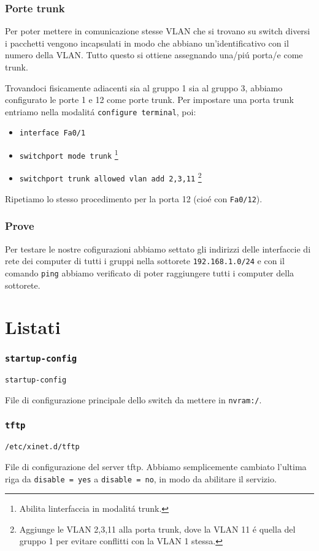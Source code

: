 \documentclass[9pt, a4paper, oneside]{article}
\begin{document}
		\section{Porte trunk}
			\par
				Per poter mettere in comunicazione stesse VLAN 
				che si trovano su switch diversi i pacchetti 
				vengono incapsulati in modo che abbiano 
				un'identificativo con il numero della VLAN. 
				Tutto questo si ottiene assegnando una/pi\'u 
				porta/e come trunk. 
			\par
				Trovandoci fisicamente adiacenti sia al gruppo 
				1 sia al gruppo 3, abbiamo configurato le porte 
				1 e 12 come porte trunk. Per impostare una 
				porta trunk entriamo nella modalit\'a 
				\texttt{configure terminal}, poi:
				\begin{itemize}
					\item
						\texttt{interface Fa0/1}
					\item
						\texttt{switchport mode trunk}
						\footnote{Abilita linterfaccia 
						in modalit\'a trunk.}
					\item
						\texttt{switchport trunk 
						allowed vlan add 2,3,11}
						\footnote{Aggiunge le 
						VLAN 2,3,11 alla porta trunk, 
						dove la VLAN 11 \'e quella del 
						gruppo 1 per evitare conflitti 
						con la VLAN 1 stessa.}
				\end{itemize}
				Ripetiamo lo stesso procedimento per la porta 
				12 (cio\'e con \texttt{Fa0/12}).
		\section{Prove}
			\par
				Per testare le nostre cofigurazioni abbiamo 
				settato gli indirizzi delle interfaccie di rete 
				dei computer di tutti i gruppi nella sottorete 
				\texttt{192.168.1.0/24} e con il comando 
				\texttt{ping} abbiamo verificato di poter 
				raggiungere tutti i computer della sottorete.
		\newpage	
	\part{Listati}					
		 \section{\texttt{startup-config}}
			\par
				\texttt{startup-config}
			\par
				File di configurazione principale dello switch 
				da mettere in \texttt{nvram:/}.
			\texttt{}
			\newpage
		 \section{\texttt{tftp}}
			\par
				\texttt{/etc/xinet.d/tftp}
			\par
				File di configurazione del server tftp. Abbiamo 
				semplicemente cambiato l'ultima riga da 
				\texttt{disable = yes} a \texttt{disable = no}, 
				in modo da abilitare il servizio.
			\texttt{}
\end{document}
